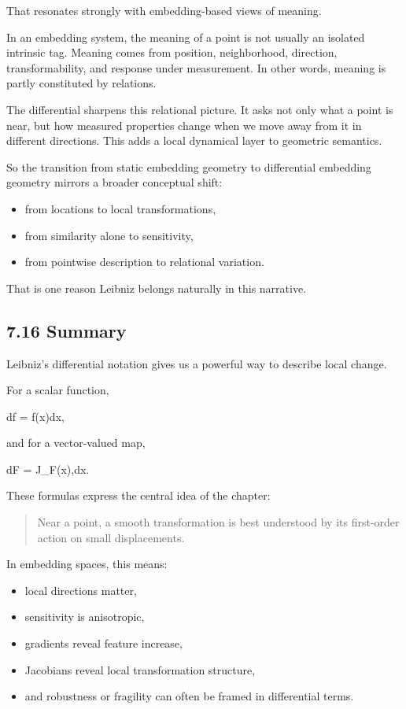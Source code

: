 \documentclass[
]{article}
\providecommand{\tightlist}{%
  \setlength{\itemsep}{0pt}\setlength{\parskip}{0pt}}
\begin{document}
That resonates strongly with embedding-based views of meaning.

In an embedding system, the meaning of a point is not usually an
isolated intrinsic tag. Meaning comes from position, neighborhood,
direction, transformability, and response under measurement. In other
words, meaning is partly constituted by relations.

The differential sharpens this relational picture. It asks not only what
a point is near, but how measured properties change when we move away
from it in different directions. This adds a local dynamical layer to
geometric semantics.

So the transition from static embedding geometry to differential
embedding geometry mirrors a broader conceptual shift:

\begin{itemize}
\tightlist
\item
  from locations to local transformations,
\item
  from similarity alone to sensitivity,
\item
  from pointwise description to relational variation.
\end{itemize}

That is one reason Leibniz belongs naturally in this narrative.

\hypertarget{summary}{%
\subsection{7.16 Summary}\label{summary}}

Leibniz's differential notation gives us a powerful way to describe
local change.

For a scalar function,

df = \nabla f(x)\cdot dx,

and for a vector-valued map,

dF = J\_F(x),dx.

These formulas express the central idea of the chapter:

\begin{quote}
Near a point, a smooth transformation is best understood by its
first-order action on small displacements.
\end{quote}

In embedding spaces, this means:

\begin{itemize}
\tightlist
\item
  local directions matter,
\item
  sensitivity is anisotropic,
\item
  gradients reveal feature increase,
\item
  Jacobians reveal local transformation structure,
\item
  and robustness or fragility can often be framed in differential terms.
\end{itemize}
\end{document}
